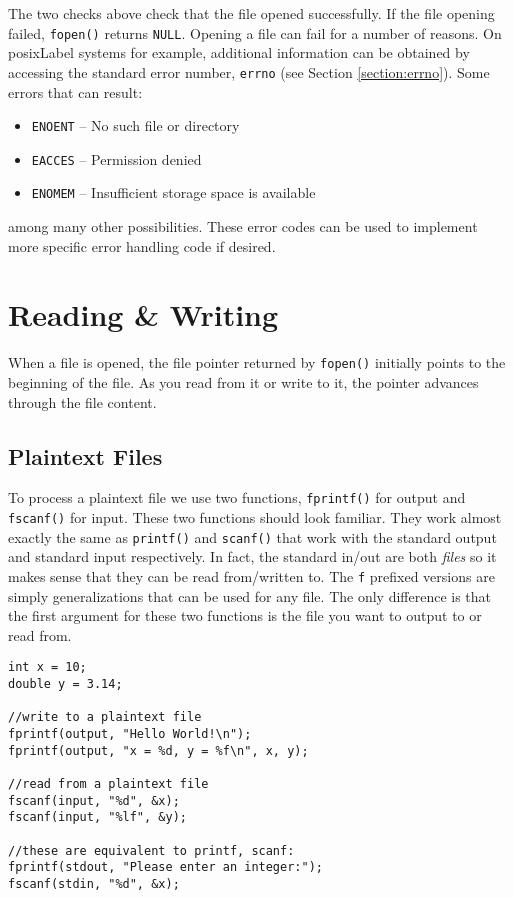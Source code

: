 The two checks above check that the file opened successfully.
If the file opening failed, \texttt{fopen()} returns
\texttt{NULL}.  Opening a file can fail for a number
of reasons.  On \gls{posixLabel} systems for example, additional
information can be obtained by accessing the standard error
number, \texttt{errno} (see Section \ref{section:errno}).  
Some errors that can result:
\begin{itemize}
  \item \texttt{ENOENT} -- No such file or directory
  \item \texttt{EACCES} -- Permission denied
  \item \texttt{ENOMEM} -- Insufficient storage space is available
\end{itemize}
among many other possibilities.  These error codes can be
used to implement more specific error handling code if desired.

\section{Reading \& Writing}

When a file is opened, the file pointer returned by
\texttt{fopen()} initially points to the beginning
of the file.  As you read from it or write to it, the pointer
advances through the file content.

\subsection{Plaintext Files}

To process a plaintext file we use two functions, \texttt{fprintf()}
for output and \texttt{fscanf()} for input.  These
two functions should look familiar.  They work almost 
exactly the same as \texttt{printf()} and
\texttt{scanf()} that work with the standard output
and standard input respectively.  In fact, the standard in/out
are both \emph{files} so it makes sense that they can be
read from/written to.  The \texttt{f} prefixed versions
are simply generalizations that can be used for any file.
The only difference is that the first argument for these
two functions is the file you want to output to or read from.

\begin{verbatim}
int x = 10;
double y = 3.14;

//write to a plaintext file
fprintf(output, "Hello World!\n");
fprintf(output, "x = %d, y = %f\n", x, y);

//read from a plaintext file
fscanf(input, "%d", &x);
fscanf(input, "%lf", &y);

//these are equivalent to printf, scanf:
fprintf(stdout, "Please enter an integer:");
fscanf(stdin, "%d", &x);
\end{verbatim}

